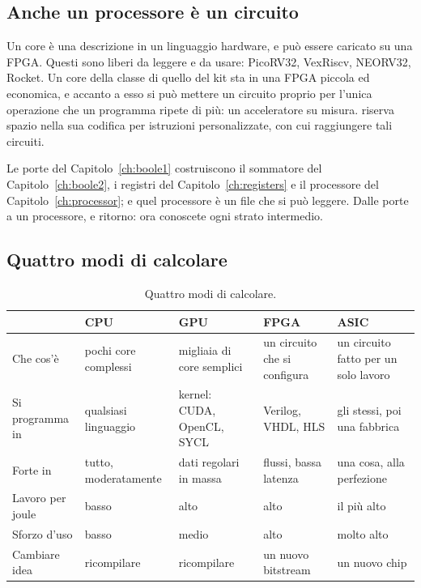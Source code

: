 \subsection{Anche un processore è un circuito}

Un core \riscv è una descrizione in un linguaggio hardware, e può essere
caricato su una FPGA. Questi  sono liberi da leggere e da
usare: PicoRV32, VexRiscv, NEORV32, Rocket. Un core della classe di quello del
kit sta in una FPGA piccola ed economica, e accanto a esso si può mettere un
circuito proprio per l'unica operazione che un programma ripete di più: un
acceleratore su misura. \riscv riserva spazio nella sua codifica per istruzioni
personalizzate, con cui raggiungere tali circuiti.

\begin{prgconcept}
Le porte del Capitolo~\ref{ch:boole1} costruiscono il sommatore del
Capitolo~\ref{ch:boole2}, i registri del Capitolo~\ref{ch:registers} e il
processore del Capitolo~\ref{ch:processor}; e quel processore è un file che si
può leggere. Dalle porte a un processore, e ritorno: ora conoscete ogni strato
intermedio.
\end{prgconcept}

\subsection{Quattro modi di calcolare}

\begin{table}[htb]
\centering\small
\caption{Quattro modi di calcolare.}\label{tab:by:four}
\begin{tabularx}{\textwidth}{@{}lLLLL@{}}
\toprule
 & \textbf{CPU} & \textbf{GPU} & \textbf{FPGA} & \textbf{ASIC}\\
\midrule
Che cos'è & pochi core complessi & migliaia di core semplici & un circuito che si configura & un circuito fatto per un solo lavoro\\
Si programma in & qualsiasi linguaggio & kernel: CUDA, OpenCL, SYCL & Verilog, VHDL, HLS & gli stessi, poi una fabbrica\\
Forte in & tutto, moderatamente & dati regolari in massa & flussi, bassa latenza & una cosa, alla perfezione\\
Lavoro per joule & basso & alto & alto & il più alto\\
Sforzo d'uso & basso & medio & alto & molto alto\\
Cambiare idea & ricompilare & ricompilare & un nuovo bitstream & un nuovo chip\\
\bottomrule
\end{tabularx}
\end{table}

